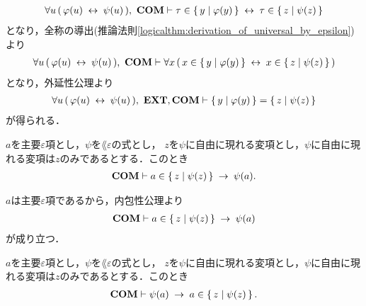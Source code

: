 \begin{sketch}
		\begin{align}
			\forall u\, (\, \varphi(u) \hspace{0.25em}\leftrightarrow\hspace{0.25em} \psi(u)\, ),\ \mbox{\bf COM} \vdash
			\tau \in \left\{\, y \mid \varphi(y)\, \right\} \hspace{0.25em}\leftrightarrow\hspace{0.25em} \tau \in \left\{\, z \mid \psi(z)\, \right\}
		\end{align}
		となり，全称の導出(推論法則\ref{logicalthm:derivation_of_universal_by_epsilon})より
		\begin{align}
			\forall u\, (\, \varphi(u) \hspace{0.25em}\leftrightarrow\hspace{0.25em} \psi(u)\, ),\ \mbox{\bf COM} \vdash
			\forall x\, (\, x \in \left\{\, y \mid \varphi(y)\, \right\} \hspace{0.25em}\leftrightarrow\hspace{0.25em} x \in \left\{\, z \mid \psi(z)\, \right\}\, )
		\end{align}
		となり，外延性公理より
		\begin{align}
			\forall u\, (\, \varphi(u) \lrarrow \psi(u)\, ),\ \EXTAX,\COMAX \vdash
			\Set{y}{\varphi(y)} = \Set{z}{\psi(z)}
		\end{align}
		が得られる．
		\QED
	\end{sketch}
	
	\begin{screen}
		\begin{thm}
		\label{thm:equivalent_formula_rewriting_7}
			$a$を主要$\varepsilon$項とし，$\psi$を$\lang{\varepsilon}$の式とし，
			$z$を$\psi$に自由に現れる変項とし，$\psi$に自由に現れる変項は$z$のみであるとする．このとき
			\begin{align}
				\mbox{\bf COM} \vdash a \in \left\{\, z \mid \psi(z)\, \right\} \hspace{0.25em}\rightarrow\hspace{0.25em} \psi(a).
			\end{align}
		\end{thm}
	\end{screen}
	
	\begin{sketch}
		$a$は主要$\varepsilon$項であるから，内包性公理より
		\begin{align}
			\mbox{\bf COM} \vdash a \in \left\{\, z \mid \psi(z)\, \right\} \hspace{0.25em}\rightarrow\hspace{0.25em} \psi(a)
		\end{align}
		が成り立つ．
		\QED
	\end{sketch}
	
	\begin{screen}
		\begin{thm}
		\label{thm:equivalent_formula_rewriting_8}
			$a$を主要$\varepsilon$項とし，$\psi$を$\lang{\varepsilon}$の式とし，
			$z$を$\psi$に自由に現れる変項とし，$\psi$に自由に現れる変項は$z$のみであるとする．このとき
			\begin{align}
				\mbox{\bf COM} \vdash \psi(a) \hspace{0.25em}\rightarrow\hspace{0.25em} a \in \left\{\, z \mid \psi(z)\, \right\}.
			\end{align}
		\end{thm}
	\end{screen}
	
